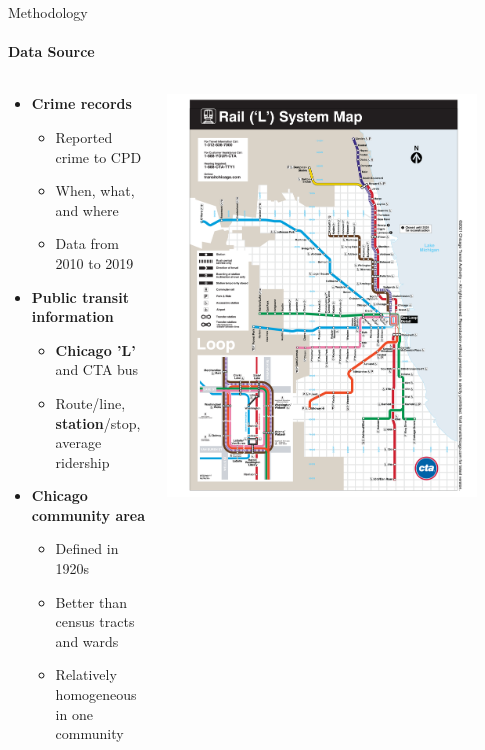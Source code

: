 \documentclass{beamer}
\begin{document}
\begin{frame}{Methodology}
\framesubtitle{Data Source}

\begin{columns}
\begin{column}{0.5\textwidth}
\begin{itemize}
    \item \textbf{Crime records}
    \begin{itemize}
        \item Reported crime to CPD
        \item When, what, and where
        \item Data from 2010 to 2019
    \end{itemize}
    \item \textbf{Public transit information}
    \begin{itemize}
        \item \textbf{Chicago 'L'} and CTA bus
        \item Route/line, \textbf{station}/stop, average ridership
    \end{itemize}
    \item \textbf{Chicago community area}
    \begin{itemize}
        \item Defined in 1920s
        \item Better than census tracts and wards
        \item Relatively homogeneous in one community
    \end{itemize}
\end{itemize}
\end{column}
\begin{column}{0.5\textwidth}  
    \begin{center}
     \includegraphics[width=0.9\textwidth]{figures/subway_map.png}

\end{center}
\end{column}
\end{columns}
\end{frame}
\end{document}
